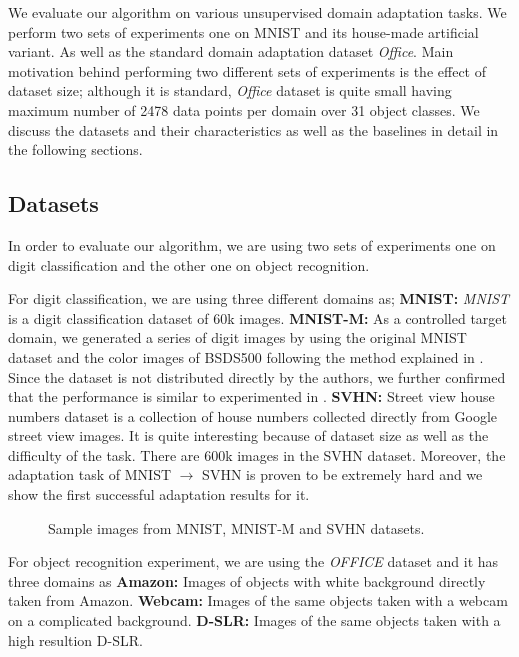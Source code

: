 We evaluate our algorithm on various unsupervised domain adaptation tasks. We perform two sets of experiments one on MNIST and its house-made artificial variant. As well as the standard domain adaptation dataset \emph{Office}\cite{office}. Main motivation behind performing two different sets of experiments is the effect of dataset size; although it is standard,  \emph{Office} dataset is quite small having maximum number of 2478 data points per domain over 31 object classes. We discuss the datasets and their characteristics as well as the baselines in detail in the following sections.

\subsection{Datasets}
In order to evaluate our algorithm, we are using two sets of experiments one on digit classification and the other one on object recognition. 

For digit classification, we are using three different domains as;
\noindent\textbf{MNIST\cite{mnist}:} \emph{MNIST} is a digit classification dataset of 60k images. 
\noindent\textbf{MNIST-M:} As a controlled target domain, we generated a series of digit images by using the original MNIST dataset and the color images of BSDS500\cite{bsds500} following the method explained in \cite{ganin15}. Since the dataset is not distributed directly by the authors, we further confirmed that the performance is similar to experimented in \cite{ganin15}.
\noindent\textbf{SVHN\cite{svhn}:} Street view house numbers dataset is a collection of house numbers collected directly from Google street view images. It is quite interesting because of dataset size as well as the difficulty of the task. There are 600k images in the SVHN\cite{svhn} dataset. Moreover, the adaptation task of MNIST $\rightarrow$ SVHN is proven to be extremely hard and we show the first successful adaptation results for it.

\begin{figure}
\caption{Sample images from MNIST, MNIST-M and SVHN datasets.}
\end{figure}

For object recognition experiment, we are using the \emph{OFFICE}\cite{office} dataset and it has three domains as
\noindent\textbf{Amazon:} Images of objects with white background directly taken from Amazon.
\noindent\textbf{Webcam:} Images of the same objects taken with a webcam on a complicated background.
\noindent\textbf{D-SLR:} Images of the same objects taken with a high resultion D-SLR.

